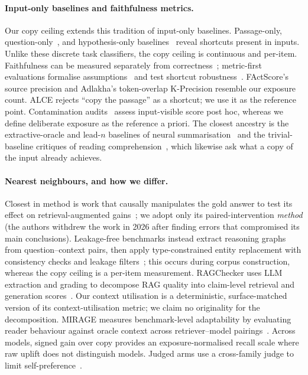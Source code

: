 \documentclass[10pt,twocolumn]{article}
\begin{document}
\paragraph{Input-only baselines and faithfulness metrics.}
Our copy ceiling extends this tradition of input-only baselines. Passage-only, question-only~\cite{kaushik2018reading}, and hypothesis-only baselines~\cite{gururangan2018artifacts,poliak2018hypothesis} reveal shortcuts present in inputs. Unlike these discrete task classifiers, the copy ceiling is continuous and per-item. Faithfulness can be measured separately from correctness~\cite{es2023ragas,adlakha2024evaluating,zhou2023contextfaithful}; metric-first evaluations formalise assumptions~\cite{min2023factscore} and test shortcut robustness~\cite{gao2023alce}. FActScore's source precision and Adlakha's token-overlap K-Precision resemble our exposure count. ALCE rejects ``copy the passage'' as a shortcut; we use it as the reference point. Contamination audits~\cite{sainz2023contamination,golchin2024timetravel} assess input-visible score post hoc, whereas we define deliberate exposure as the reference a priori. The closest ancestry is the extractive-oracle and lead-$n$ baselines of neural summarisation~\cite{see2017pointergenerator,narayan2018xsum} and the trivial-baseline critiques of reading comprehension~\cite{kaushik2018reading}, which likewise ask what a copy of the input already achieves.

\paragraph{Nearest neighbours, and how we differ.}
Closest in method is work that causally manipulates the gold answer to test its effect on retrieval-augmented gains~\cite{answerpresence2026}; we adopt only its paired-intervention \emph{method} (the authors withdrew the work in 2026 after finding errors that compromised its main conclusions). Leakage-free benchmarks instead extract reasoning graphs from question--context pairs, then apply type-constrained entity replacement with consistency checks and leakage filters~\cite{seedrg2026}; this occurs during corpus construction, whereas the copy ceiling is a per-item measurement. RAGChecker uses LLM extraction and grading to decompose RAG quality into claim-level retrieval and generation scores~\cite{ragchecker2024}. Our context utilisation is a deterministic, surface-matched version of its context-utilisation metric; we claim no originality for the decomposition. MIRAGE measures benchmark-level adaptability by evaluating reader behaviour against oracle context across retriever--model pairings~\cite{mirage2025}. Across models, signed gain over copy provides an exposure-normalised recall scale where raw uplift does not distinguish models. Judged arms use a cross-family judge to limit self-preference~\cite{zheng2023judging,panickssery2024selfpreference}.
\end{document}
